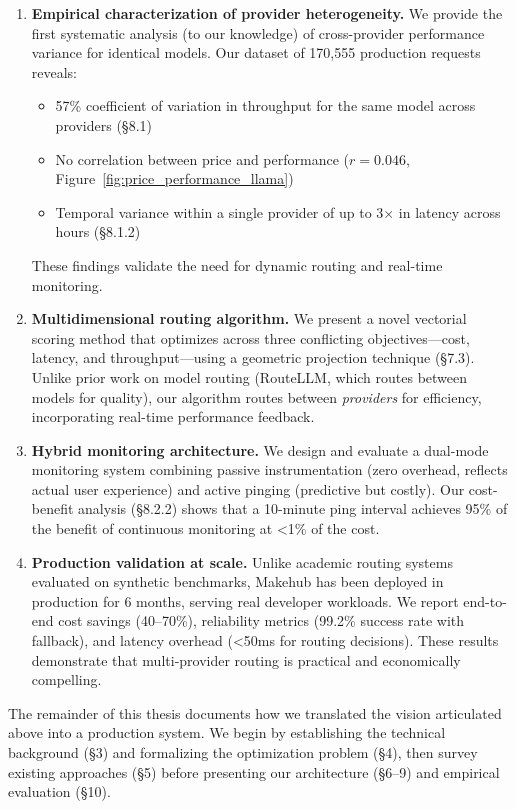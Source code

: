 \documentclass[english]{article}
\begin{document}
\begin{enumerate}
\item \textbf{Empirical characterization of provider heterogeneity.} We provide the first systematic analysis (to our knowledge) of cross-provider performance variance for identical models. Our dataset of 170,555 production requests reveals:
  \begin{itemize}
  \item 57\% coefficient of variation in throughput for the same model across providers (§8.1)
  \item No correlation between price and performance ($r = 0.046$, Figure~\ref{fig:price_performance_llama})
  \item Temporal variance within a single provider of up to 3$\times$ in latency across hours (§8.1.2)
  \end{itemize}
  These findings validate the need for dynamic routing and real-time monitoring.

\item \textbf{Multidimensional routing algorithm.} We present a novel vectorial scoring method that optimizes across three conflicting objectives—cost, latency, and throughput—using a geometric projection technique (§7.3). Unlike prior work on model routing (RouteLLM, which routes between models for quality), our algorithm routes between \emph{providers} for efficiency, incorporating real-time performance feedback.

\item \textbf{Hybrid monitoring architecture.} We design and evaluate a dual-mode monitoring system combining passive instrumentation (zero overhead, reflects actual user experience) and active pinging (predictive but costly). Our cost-benefit analysis (§8.2.2) shows that a 10-minute ping interval achieves 95\% of the benefit of continuous monitoring at <1\% of the cost.

\item \textbf{Production validation at scale.} Unlike academic routing systems evaluated on synthetic benchmarks, Makehub has been deployed in production for 6 months, serving real developer workloads. We report end-to-end cost savings (40--70\%), reliability metrics (99.2\% success rate with fallback), and latency overhead (<50ms for routing decisions). These results demonstrate that multi-provider routing is practical and economically compelling.
\end{enumerate}

\medskip

\noindent The remainder of this thesis documents how we translated the vision articulated above into a production system.
We begin by establishing the technical background (§3) and formalizing the optimization problem (§4), then survey existing approaches (§5) before presenting our architecture (§6--9) and empirical evaluation (§10).
\end{document}
